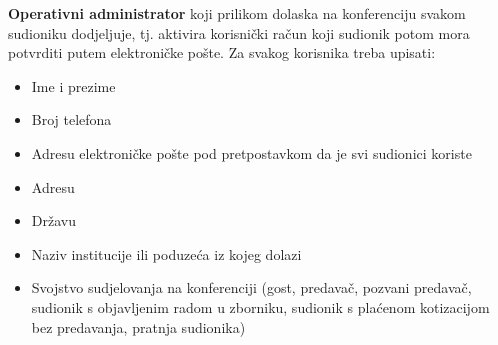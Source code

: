 		\item\textbf{Operativni administrator} koji prilikom dolaska na konferenciju svakom sudioniku dodjeljuje, tj. aktivira korisnički račun koji sudionik potom mora potvrditi putem elektroničke pošte. Za svakog korisnika treba upisati:
		\begin{itemize}
		    \item   Ime i prezime
		    \item   Broj telefona
		    \item   Adresu elektroničke pošte pod pretpostavkom da je svi sudionici koriste
		    \item   Adresu
		    \item   Državu
		    \item Naziv institucije ili poduzeća iz kojeg dolazi
		    \item Svojstvo sudjelovanja na konferenciji (gost, predavač, pozvani predavač, sudionik s objavljenim radom u zborniku, sudionik s plaćenom kotizacijom bez predavanja, pratnja sudionika)

		\end{itemize}
		
